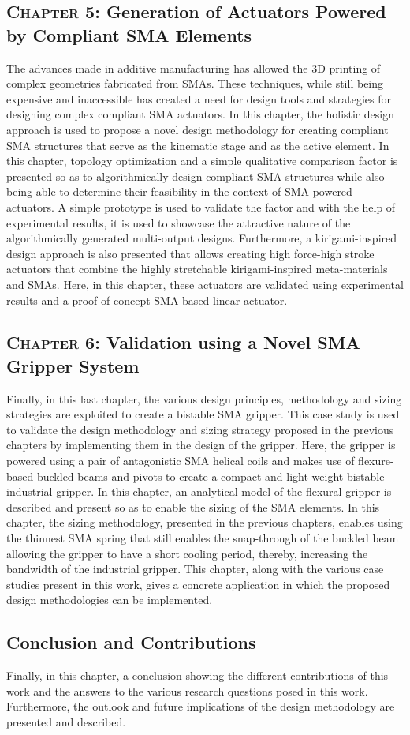 \subsection*{\textsc{Chapter 5}: Generation of Actuators Powered by Compliant SMA Elements}
The advances made in additive manufacturing has allowed the 3D printing of complex geometries fabricated from SMAs. These techniques, while still being expensive and inaccessible has created a need for design tools and strategies for designing complex compliant SMA actuators. In this chapter, the holistic design approach is used to propose a novel design methodology for creating compliant SMA structures that serve as the kinematic stage and as the active element. In this chapter, topology optimization and a simple qualitative comparison factor is presented so as to algorithmically design compliant SMA structures while also being able to determine their feasibility in the context of SMA-powered actuators. A simple prototype is used to validate the factor and with the help of experimental results, it is used to showcase the attractive nature of the algorithmically generated multi-output designs. Furthermore, a kirigami-inspired design approach is also presented that allows creating high force-high stroke actuators that combine the highly stretchable kirigami-inspired meta-materials and SMAs. Here, in this chapter, these actuators are validated using experimental results and a proof-of-concept SMA-based linear actuator.

\subsection*{\textsc{Chapter 6}: Validation using a Novel SMA Gripper System}
Finally, in this last chapter, the various design principles, methodology and sizing strategies are exploited to create a bistable SMA gripper. This case study is used to validate the design methodology and sizing strategy proposed in the previous chapters by implementing them in the design of the gripper. Here, the gripper is powered using a pair of antagonistic SMA helical coils and makes use of flexure-based buckled beams and pivots to create a compact and light weight bistable industrial gripper. In this chapter, an analytical model of the flexural gripper is described and present so as to enable the sizing of the SMA elements. In this chapter, the sizing methodology, presented in the previous chapters, enables using the thinnest SMA spring that still enables the snap-through of the buckled beam allowing the gripper to have a short cooling period, thereby, increasing the bandwidth of the industrial gripper. This chapter, along with the various case studies present in this work, gives a concrete application in which the proposed design methodologies can be implemented.

\subsection*{Conclusion and Contributions}
Finally, in this chapter, a conclusion showing the different contributions of this work and the answers to the various research questions posed in this work. Furthermore, the outlook and future implications of the design methodology are presented and described.
